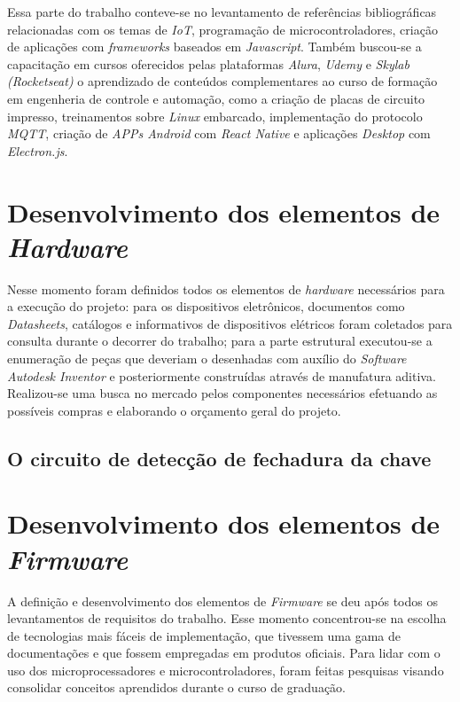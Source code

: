 Essa parte do trabalho conteve-se no levantamento de referências bibliográficas relacionadas com os temas de \textit{IoT}, programação de microcontroladores, criação de aplicações com \textit{frameworks} baseados em \textit{Javascript}. Também buscou-se a capacitação em cursos oferecidos pelas plataformas \textit{Alura}, \textit{Udemy} e \textit{Skylab (Rocketseat)} o aprendizado de conteúdos complementares ao curso de formação em engenheria de controle e automação, como a criação de placas de circuito impresso, treinamentos sobre \textit{Linux} embarcado, implementação do protocolo \textit{MQTT}, criação de \textit{APPs Android} com \textit{React Native} e aplicações \textit{Desktop} com \textit{Electron.js}.

\section{Desenvolvimento dos elementos de \textit{Hardware}}
\label{sec: dev_ele_hw}

Nesse momento foram definidos todos os elementos de \textit{hardware} necessários para a execução do projeto: para os dispositivos eletrônicos, documentos como \textit{Datasheets}, catálogos e informativos de dispositivos elétricos foram coletados para consulta durante o decorrer do trabalho; para a parte estrutural executou-se a enumeração de peças que deveriam o desenhadas com auxílio do \textit{Software Autodesk Inventor} e posteriormente construídas através de manufatura aditiva.  Realizou-se uma busca no mercado pelos componentes necessários efetuando as possíveis compras e elaborando o orçamento geral do projeto.

\subsection{O circuito de detecção de fechadura da chave} 

\section{Desenvolvimento dos elementos de \textit{Firmware}}
\label{sec: dev_ele_fw}

A definição e desenvolvimento dos elementos de \textit{Firmware} se deu após todos os levantamentos de requisitos do trabalho. Esse momento concentrou-se na escolha de tecnologias mais fáceis de implementação, que tivessem uma gama de documentações e que fossem empregadas em produtos oficiais. Para lidar com o uso dos microprocessadores e microcontroladores, foram feitas pesquisas visando consolidar conceitos aprendidos durante o curso de graduação.

